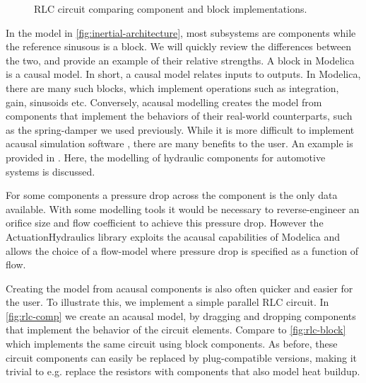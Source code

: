 \documentclass[\rootfolder/main.tex]{subfiles}
\begin{document}
\begin{figure}[ht]
    \centering
        {
        }\par\bigskip
        {
        }
    \caption{RLC circuit comparing component and block implementations.\label{fig:rlc}}
\end{figure}

In the model in \cref{fig:inertial-architecture}, most subsystems are components while the reference sinusous is a block.
We will quickly review the differences between the two, and provide an example of their relative strengths.
A block in Modelica is a causal model.
In short, a causal model relates inputs to outputs. In Modelica, there are many such blocks, which implement operations such as integration, gain, sinusoids etc.
Conversely, acausal modelling creates the model from components that implement the behaviors of their real-world counterparts, such as the spring-damper we used previously.
While it is more difficult to implement acausal simulation software \cite{tiller2001}, there are many benefits to the user.
An example is provided in \cite{harman2006}.
Here, the modelling of hydraulic components for automotive systems is discussed.

\begin{displayquote}
    For some components a pressure drop across the component is the only data available.
    With some modelling tools it would be necessary to reverse-engineer an orifice size and flow coefficient to achieve this pressure drop.
    However the ActuationHydraulics library exploits the acausal capabilities of Modelica and allows the choice of a flow-model where pressure drop is specified as a function of flow.
\end{displayquote}

Creating the model from acausal components is also often quicker and easier for the user.
To illustrate this, we implement a simple parallel RLC circuit.
In \cref{fig:rlc-comp} we create an acausal model, by dragging and dropping components that implement the behavior of the circuit elements.
Compare to \cref{fig:rlc-block} which implements the same circuit using block components.
As before, these circuit components can easily be replaced by plug-compatible versions, making it trivial to e.g. replace the resistors with components that also model heat buildup.
\end{document}
